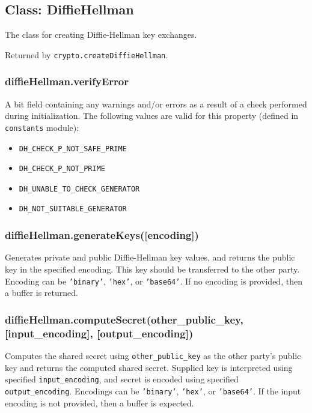 \subsection{Class: DiffieHellman}\label{class-diffiehellman}

The class for creating Diffie-Hellman key exchanges.

Returned by \texttt{crypto.createDiffieHellman}.

\subsubsection{diffieHellman.verifyError}\label{diffiehellman.verifyerror}

A bit field containing any warnings and/or errors as a result of a check
performed during initialization. The following values are valid for this
property (defined in \texttt{constants} module):

\begin{itemize}
\itemsep1pt\parskip0pt
\item
  \texttt{DH\_CHECK\_P\_NOT\_SAFE\_PRIME}
\item
  \texttt{DH\_CHECK\_P\_NOT\_PRIME}
\item
  \texttt{DH\_UNABLE\_TO\_CHECK\_GENERATOR}
\item
  \texttt{DH\_NOT\_SUITABLE\_GENERATOR}
\end{itemize}

\subsubsection{diffieHellman.generateKeys({[}encoding{]})}\label{diffiehellman.generatekeysencoding}

Generates private and public Diffie-Hellman key values, and returns the
public key in the specified encoding. This key should be transferred to
the other party. Encoding can be \texttt{'binary'}, \texttt{'hex'}, or
\texttt{'base64'}. If no encoding is provided, then a buffer is
returned.

\subsubsection{diffieHellman.computeSecret(other\_public\_key,
{[}input\_encoding{]},
{[}output\_encoding{]})}\label{diffiehellman.computesecretotherux5fpublicux5fkey-inputux5fencoding-outputux5fencoding}

Computes the shared secret using \texttt{other\_public\_key} as the
other party's public key and returns the computed shared secret.
Supplied key is interpreted using specified \texttt{input\_encoding},
and secret is encoded using specified \texttt{output\_encoding}.
Encodings can be \texttt{'binary'}, \texttt{'hex'}, or
\texttt{'base64'}. If the input encoding is not provided, then a buffer
is expected.

